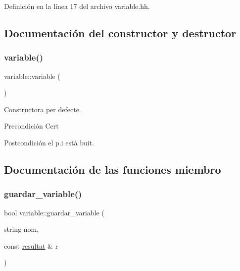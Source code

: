 Definición en la línea 17 del archivo variable.\+hh.



\subsection{Documentación del constructor y destructor}
\hypertarget{classvariable_a424009148a020b406a8a5ecefa854edc}{}\label{classvariable_a424009148a020b406a8a5ecefa854edc} 
\subsubsection{\texorpdfstring{variable()}{variable()}}
{\footnotesize\ttfamily variable\+::variable (\begin{DoxyParamCaption}{ }\end{DoxyParamCaption})}



Constructora per defecte. 

\begin{DoxyPrecond}{Precondición}
Cert 
\end{DoxyPrecond}
\begin{DoxyPostcond}{Postcondición}
el p.\+i està buit. 
\end{DoxyPostcond}


\subsection{Documentación de las funciones miembro}
\hypertarget{classvariable_ac8e2c3022d51e243b4c336c023300d28}{}\label{classvariable_ac8e2c3022d51e243b4c336c023300d28} 
\subsubsection{\texorpdfstring{guardar\+\_\+variable()}{guardar\_variable()}}
{\footnotesize\ttfamily bool variable\+::guardar\+\_\+variable (\begin{DoxyParamCaption}\item[{string}]{nom,  }\item[{const \hyperlink{classresultat}{resultat} \&}]{r }\end{DoxyParamCaption})}



